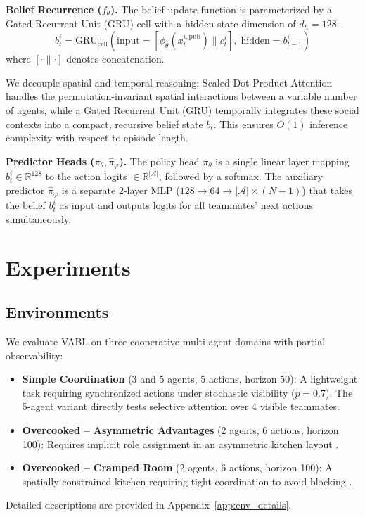 \documentclass{article}
\theoremstyle{plain}
\theoremstyle{definition}
\theoremstyle{remark}
\begin{document}
\textbf{Belief Recurrence ($f_\theta$).}
The belief update function is parameterized by a Gated Recurrent Unit (GRU) cell with a hidden state dimension of $d_h = 128$.
\[ b_t^i = \mathrm{GRU}_{\mathrm{cell}}\left( \text{input} = [\phi_\theta(x_t^{i,\mathrm{pub}}) \parallel c_t^i], \; \text{hidden} = b_{t-1}^i \right) \]
where $[\cdot \parallel \cdot]$ denotes concatenation.

We decouple spatial and temporal reasoning: Scaled Dot-Product Attention handles the permutation-invariant spatial interactions between a variable number of agents, while a Gated Recurrent Unit (GRU) temporally integrates these social contexts into a compact, recursive belief state $b_t$. This ensures $O(1)$ inference complexity with respect to episode length.

\textbf{Predictor Heads ($\pi_\theta, \hat{\pi}_\varphi$).}
The policy head $\pi_\theta$ is a single linear layer mapping $b_t^i \in \mathbb{R}^{128}$ to the action logits $\in \mathbb{R}^{|\mathcal{A}|}$, followed by a softmax. The auxiliary predictor $\hat{\pi}_\varphi$ is a separate 2-layer MLP ($128 \to 64 \to |\mathcal{A}| \times (N{-}1)$) that takes the belief $b_t^i$ as input and outputs logits for all teammates' next actions simultaneously.



\section{Experiments}
\label{sec:experiments}

\subsection{Environments}
We evaluate VABL on three cooperative multi-agent domains with partial observability:
\begin{itemize}
\item \textbf{Simple Coordination} (3 and 5 agents, 5 actions, horizon 50): A lightweight task requiring synchronized actions under stochastic visibility ($p=0.7$). The 5-agent variant directly tests selective attention over 4 visible teammates.
\item \textbf{Overcooked -- Asymmetric Advantages} (2 agents, 6 actions, horizon 100): Requires implicit role assignment in an asymmetric kitchen layout \cite{carroll2019utility}.
\item \textbf{Overcooked -- Cramped Room} (2 agents, 6 actions, horizon 100): A spatially constrained kitchen requiring tight coordination to avoid blocking \cite{carroll2019utility}.
\end{itemize}
Detailed descriptions are provided in Appendix~\ref{app:env_details}.
\end{document}
